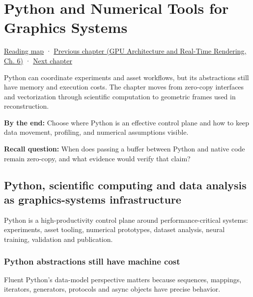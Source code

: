 \chapter{Python and Numerical Tools for Graphics Systems}\label{01-foundations-i-ch017-python-and-numerical-tools-for-graphics-systems}\hypertarget{01-foundations-i-ch017}{}\label{stagechapter:01-foundations-i-ch017}

\hyperref[volume-reading-map]{Reading map} · \href{../06-GPU-Architecture-and-Real-Time-Rendering/main.pdf\#nameddest=01-foundations-i-ch016-profile-gpus-and-respect-apple-ownership-boundaries}{Previous chapter (GPU Architecture and Real-Time Rendering, Ch. 6)} · \hyperref[01-foundations-i-ch018-vectors-for-light-and-frames]{Next chapter}

Python can coordinate experiments and asset workflows, but its abstractions still have memory and execution costs. The chapter moves from zero-copy interfaces and vectorization through scientific computation to geometric frames used in reconstruction.

\textbf{By the end:} Choose where Python is an effective control plane and how to keep data movement, profiling, and numerical assumptions visible.

\textbf{Recall question:} When does passing a buffer between Python and native code remain zero-copy, and what evidence would verify that claim?

\section{Python, scientific computing and data analysis as graphics-systems infrastructure}\label{01-foundations-i-ch017-python-scientific-computing-and-data-analysis-as-graphics-systems-infrastructure}

Python is a high-productivity control plane around performance-critical systems: experiments, asset tooling, numerical prototypes, dataset analysis, neural training, validation and publication.

\subsection{Python abstractions still have machine cost}\label{01-foundations-i-ch017-python-abstractions-still-have-machine-cost}

Fluent Python's data-model perspective matters because sequences, mappings, iterators, generators, protocols and async objects have precise behavior.

